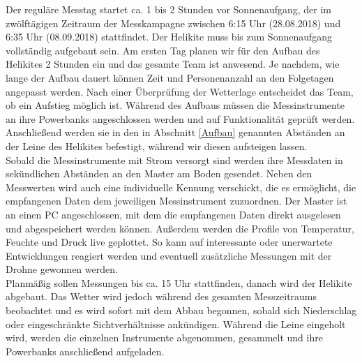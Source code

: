 \documentclass[a4paper,11pt,DIV=calc,tablecaptionabove,headinclude,twoside]{article}
\begin{document}
Der reguläre Messtag startet ca. 1 bis 2 Stunden vor Sonnenaufgang, der im zwölftägigen Zeitraum der Messkampagne zwischen 6:15 Uhr (28.08.2018) und 6:35 Uhr (08.09.2018) stattfindet. Der Helikite muss bis zum Sonnenaufgang vollständig aufgebaut sein. Am ersten Tag planen wir für den Aufbau des Helikites 2 Stunden ein und das gesamte Team ist anwesend. Je nachdem, wie lange der Aufbau dauert können Zeit und Personenanzahl an den Folgetagen angepasst werden. Nach einer Überprüfung der Wetterlage entscheidet das Team, ob ein Aufstieg möglich ist. Während des Aufbaus müssen die Messinstrumente an ihre Powerbanks angeschlossen werden und auf Funktionalität geprüft werden. Anschließend werden sie in den in Abschnitt \ref{Aufbau} genannten Abständen an der Leine des Helikites befestigt, während wir diesen aufsteigen lassen. \\

Sobald die Messinstrumente mit Strom versorgt sind werden ihre Messdaten in sekündlichen Abständen an den Master am Boden gesendet. Neben den Messwerten wird auch eine individuelle Kennung verschickt, die es ermöglicht, die empfangenen Daten dem jeweiligen Messinstrument zuzuordnen. Der Master ist an einen PC angeschlossen, mit dem die empfangenen Daten direkt ausgelesen und abgespeichert werden können. Außerdem werden die Profile von Temperatur, Feuchte und Druck live geplottet. So kann auf interessante oder unerwartete Entwicklungen reagiert werden und eventuell zusätzliche Messungen mit der Drohne gewonnen werden.\\

Planmäßig sollen Messungen bis ca. 15 Uhr stattfinden, danach wird der Helikite abgebaut. Das Wetter wird jedoch während des gesamten Messzeitraums beobachtet und es wird sofort mit dem Abbau begonnen, sobald sich Niederschlag oder eingeschränkte Sichtverhältnisse ankündigen. Während die Leine eingeholt wird, werden die einzelnen Instrumente abgenommen, gesammelt und ihre Powerbanks anschließend aufgeladen. \\
\end{document}
